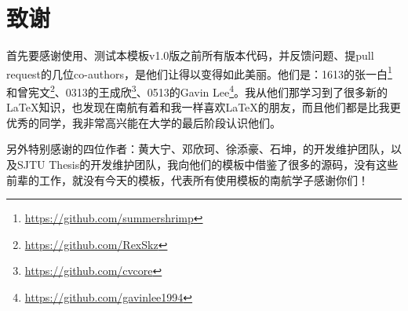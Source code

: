 \chapter{致谢}

首先要感谢使用、测试本模板v1.0版之前所有版本代码，并反馈问题、提pull request的几位co-authors，是他们让\nuaathesis 得以变得如此美丽。他们是：1613的张一白\footnote{\url{https://github.com/summershrimp}}和曾宪文\footnote{\url{https://github.com/RexSkz}}、0313的王成欣\footnote{\url{https://github.com/cvcore}}、0513的Gavin Lee\footnote{\url{https://github.com/gavinlee1994}}。我从他们那学习到了很多新的\LaTeX 知识，也发现在南航有着和我一样喜欢\LaTeX 的朋友，而且他们都是比我更优秀的同学，我非常高兴能在大学的最后阶段认识他们。

另外特别感谢\oldnuaathesis 的四位作者：黄大宁、邓欣珂、徐添豪、石坤，\seuthesix 的开发维护团队，以及SJTU Thesis的开发维护团队，我向他们的模板中借鉴了很多的源码，没有这些前辈的工作，就没有今天的\nuaathesis 模板，代表所有使用\nuaathesis 模板的南航学子感谢你们！
